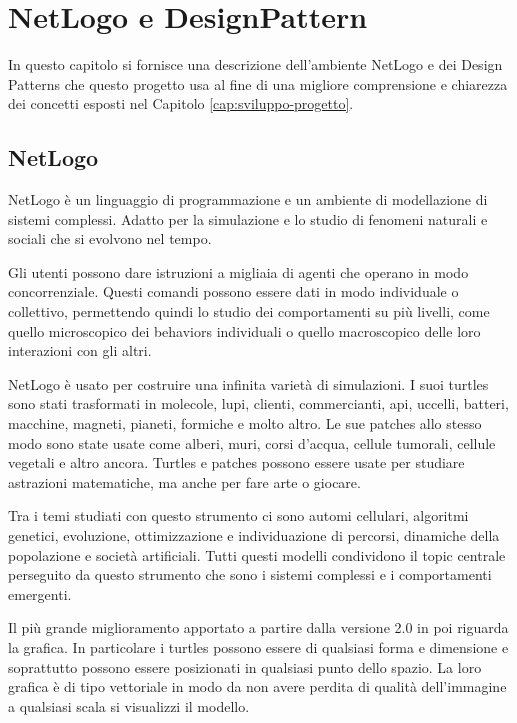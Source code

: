 \chapter{NetLogo e DesignPattern}

In questo capitolo si fornisce una descrizione dell'ambiente NetLogo e dei Design Patterns che questo progetto usa al fine di una migliore comprensione e chiarezza dei concetti esposti nel Capitolo \ref{cap:sviluppo-progetto}.
\section {NetLogo} 
\label{sec:netlogo}

NetLogo \nocite{wilensky-tisue} \cite{netlogo} è un linguaggio di programmazione e un ambiente di modellazione di sistemi complessi. Adatto per la simulazione e lo studio di fenomeni naturali e sociali che si evolvono nel tempo.

Gli utenti possono dare istruzioni a migliaia di agenti che operano in modo concorrenziale. Questi comandi possono essere dati in modo individuale o collettivo, permettendo quindi lo studio dei comportamenti su più livelli, come quello microscopico dei behaviors individuali o quello macroscopico delle loro interazioni con gli altri.

NetLogo è usato per costruire una infinita varietà di simulazioni. I suoi turtles sono stati trasformati in molecole, lupi, clienti, commercianti, api, uccelli, batteri, macchine, magneti, pianeti, formiche e molto altro. Le sue patches allo stesso modo sono state usate come alberi, muri, corsi d'acqua, cellule tumorali, cellule vegetali e altro ancora. Turtles e patches possono essere usate per studiare astrazioni matematiche, ma anche per fare arte o giocare.

Tra i temi studiati con questo strumento ci sono automi cellulari, algoritmi genetici, evoluzione, ottimizzazione e individuazione di percorsi, dinamiche della popolazione e società artificiali. Tutti questi modelli condividono il topic centrale perseguito da questo strumento che sono i sistemi complessi e i comportamenti emergenti.

Il più grande miglioramento apportato a partire dalla versione 2.0 in poi riguarda la grafica. In particolare i turtles possono essere di qualsiasi forma e dimensione e soprattutto possono essere posizionati in qualsiasi punto dello spazio. La loro grafica è di tipo vettoriale in modo da non avere perdita di qualità dell'immagine a qualsiasi scala si visualizzi il modello.

